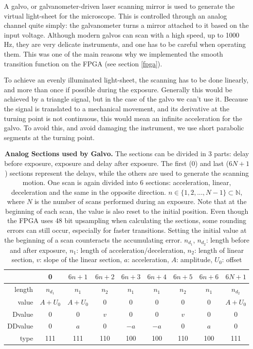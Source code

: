 \documentclass{tdk_style}
\begin{document}
A galvo, or galvanometer-driven laser scanning mirror is used to generate the virtual light-sheet for the microscope. This is controlled through an analog channel quite simply: the galvanometer turns a mirror attached to it based on the input voltage. Although modern galvos can scan with a high speed, up to 1000 Hz, they are very delicate instruments, and one has to be careful when operating them. This was one of the main reasons why we implemented the smooth transition function on the FPGA (see section \ref{fpga}).

To achieve an evenly illuminated light-sheet, the scanning has to be done linearly, and more than once if possible during the exposure. Generally this would be achieved by a triangle signal, but in the case of the galvo we can't use it. Because the signal is translated to a mechanical movement, and its derivative at the turning point is not continuous, this would mean an infinite acceleration for the galvo. To avoid this, and avoid damaging the instrument, we use short parabolic segments at the turning point.


\begin{table}[phtb]
\centering
\begin{tabular}{r|c||c|c|c|c|c|c||c}
			& 0 & $6n+1$ & $6n+2$ & $6n+3$ & $6n+4$ & $6n+5$ & $6n+6$ & $6N+1$ \\ \hline \hline
	length  & $n_{d_1}$ & $n_1$  & $n_2$ & $n_1$ & $n_1$ & $n_2$ & $n_1$ & $n_{d_2}$ \\
	value   & $A+U_0$   & $A+U_0$& 0     & 0     & 0     & 0     & 0     & $A+U_0$       \\
	Dvalue  & 0         & 0      & $v$   & 0     & 0     & $v$   & 0     & 0         \\
	DDvalue & 0         & $a$    & 0     & $-a$  & $-a$  & 0     & $a$   & 0         \\
	type    & 111       & 111    & 110   & 100   & 100   & 110   & 100   & 111       \\
\end{tabular}
\caption{\textbf{Analog Sections used by Galvo.} The sections can be divided in 3 parts: delay before exposure, exposure and delay after exposure. The first (0) and last ($6N+1$) sections represent the delays, while the others are used to generate the scanning motion. One scan is again divided into 6 sections: acceleration, linear, deceleration and the same in the opposite direction. $n\in \{1, 2, ... , N-1\} \subset \mathbb{N}$, where $N$ is the number of scans performed during an exposure. Note that at the beginning of each scan, the value is also reset to the initial position. Even though the FPGA uses 48 bit upsampling when calculating the sections, some rounding errors can still occur, especially for faster transitions. Setting the initial value at the beginning of a scan counteracts the accumulating error. $n_{d_1}$, $n_{d_2}$: length before and after exposure, $n_1$: length of acceleration/deceleration, $n_2$: length of linear section, $v$: slope of the linear section, $a$: acceleration, $A$: amplitude, $U_0$: offset}
\label{tab:galvo}
\end{table}
\end{document}
